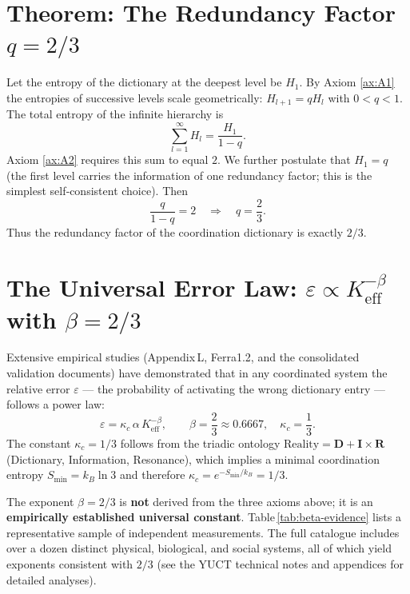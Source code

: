 \documentclass[12pt,a4paper]{article}
\begin{document}
	
	\section{Theorem: The Redundancy Factor \(q = 2/3\)}
	
	Let the entropy of the dictionary at the deepest level be \(H_1\).  By Axiom \ref{ax:A1} the entropies of successive levels scale geometrically: \(H_{l+1} = q H_l\) with \(0 < q < 1\).  The total entropy of the infinite hierarchy is
	\[
	\sum_{l=1}^{\infty} H_l = \frac{H_1}{1-q}.
	\]
	Axiom \ref{ax:A2} requires this sum to equal \(2\).  We further postulate that \(H_1 = q\) (the first level carries the information of one redundancy factor; this is the simplest self‑consistent choice).  Then
	\begin{equation}
		\frac{q}{1-q} = 2 \quad\Longrightarrow\quad \boxed{q = \frac{2}{3}}.
		\label{eq:q}
	\end{equation}
	Thus the redundancy factor of the coordination dictionary is exactly \(2/3\).
	
	\section{The Universal Error Law: \(\varepsilon \propto K_{\mathrm{eff}}^{-\beta}\) with \(\beta = 2/3\)}
	
	Extensive empirical studies (Appendix L, Ferra1.2, and the consolidated validation documents) have demonstrated that in any coordinated system the relative error \(\varepsilon\) — the probability of activating the wrong dictionary entry — follows a power law:
	\begin{equation}
		\boxed{\varepsilon = \kappa_c \, \alpha \, K_{\mathrm{eff}}^{-\beta}, \qquad \beta = \frac{2}{3} \approx 0.6667,\quad \kappa_c = \frac{1}{3}}.
		\label{eq:error-law}
	\end{equation}
	The constant \(\kappa_c = 1/3\) follows from the triadic ontology \(\text{Reality} = \mathbf{D} + \mathbf{I} \times \mathbf{R}\) (Dictionary, Information, Resonance), which implies a minimal coordination entropy \(S_{\min} = k_B \ln 3\) and therefore \(\kappa_c = e^{-S_{\min}/k_B} = 1/3\).
	
	The exponent \(\beta = 2/3\) is \textbf{not} derived from the three axioms above; it is an \textbf{empirically established universal constant}.  Table \ref{tab:beta-evidence} lists a representative sample of independent measurements.  The full catalogue includes over a dozen distinct physical, biological, and social systems, all of which yield exponents consistent with \(2/3\) (see the YUCT technical notes and appendices for detailed analyses).
	
\end{document}
